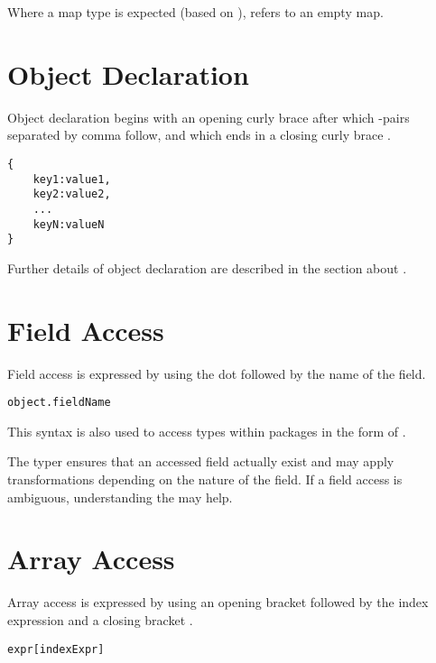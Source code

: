 
Where a map type is expected (based on ), \expr{[]} refers to an empty map.


\section{Object Declaration}
\label{expression-object-declaration}

Object declaration begins with an opening curly brace \expr{\{} after which -pairs separated by comma \expr{,} follow, and which ends in a closing curly brace \expr{\}}.

\begin{lstlisting}
{
	key1:value1,
	key2:value2,
	...
	keyN:valueN
}
\end{lstlisting}
Further details of object declaration are described in the section about .


\section{Field Access}
\label{expression-field-access}

Field access is expressed by using the dot  followed by the name of the field.

\begin{lstlisting}
object.fieldName
\end{lstlisting}

This syntax is also used to access types within packages in the form of .

The typer ensures that an accessed field actually exist and may apply transformations depending on the nature of the field. If a field access is ambiguous, understanding the  may help.


\section{Array Access}
\label{expression-array-access}

Array access is expressed by using an opening bracket \expr{[} followed by the index expression and a closing bracket \expr{]}.

\begin{lstlisting}
expr[indexExpr]
\end{lstlisting}

